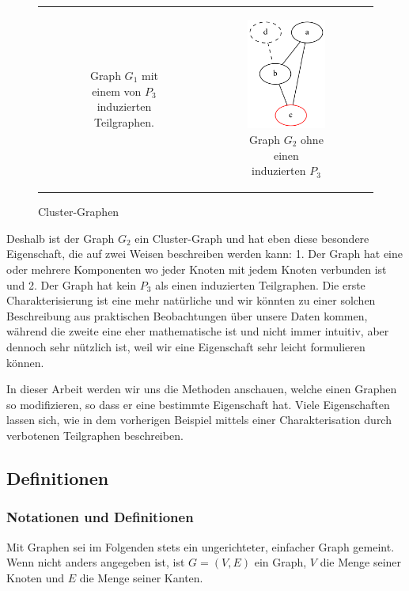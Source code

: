 \documentclass[12pt,a4paper,onecolumn,oneside,titlepage]{article}
\begin{document}
\begin{figure}
\begin{tabular}[c]{ccc}
\begin{subfigure}[b]{0.32\textwidth}
	    \caption{Graph $G_1$ mit einem von $P_3$ induzierten Teilgraphen.}
	    \label{fig:mot-1}
	  \end{subfigure}&
    \begin{subfigure}[b]{0.32\textwidth}
       \includegraphics[scale=0.5]{dot/dot_explored_3.png}
	    \caption{Graph $G_2$ ohne einen induzierten $P_3$}
	    \label{fig:mot-2}
    \end{subfigure}
  \end{tabular}
  \caption{Cluster-Graphen}\label{fig:mot}
\end{figure}

Deshalb ist der Graph $G_2$ ein Cluster-Graph und hat eben diese besondere Eigenschaft, die auf zwei Weisen beschreiben werden kann: 1. Der Graph hat eine oder mehrere Komponenten wo jeder Knoten mit jedem Knoten verbunden ist und 2. Der Graph hat kein $P_3$ als einen induzierten Teilgraphen. Die erste Charakterisierung ist eine mehr natürliche und wir könnten zu einer solchen Beschreibung aus praktischen Beobachtungen über unsere Daten kommen, während die zweite eine eher mathematische ist und nicht immer intuitiv, aber dennoch sehr nützlich ist, weil wir eine Eigenschaft sehr leicht formulieren können.

In dieser Arbeit werden wir uns die Methoden anschauen, welche einen Graphen so modifizieren, so dass er eine bestimmte Eigenschaft hat. Viele Eigenschaften lassen sich, wie in dem vorherigen Beispiel mittels einer Charakterisation durch verbotenen Teilgraphen beschreiben.


\subsection{Definitionen}
\subsubsection{Notationen und Definitionen}
\label{sec:notation}
Mit Graphen sei im Folgenden stets ein ungerichteter, einfacher Graph gemeint. Wenn nicht anders angegeben ist, ist $G=(V,E)$ ein Graph, $V$ die Menge seiner Knoten und $E$ die Menge seiner Kanten.
\end{document}
